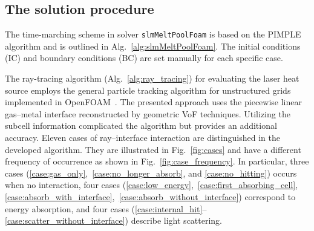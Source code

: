 \documentclass[final]{elsarticle} %
\newcommand{\OpenFOAM}{OpenFOAM\textregistered\xspace}
\begin{document}
\subsection{The solution procedure}

The time-marching scheme in solver \texttt{slmMeltPoolFoam} is based on the PIMPLE algorithm
and is outlined in Alg.~\ref{alg:slmMeltPoolFoam}.
The initial conditions (IC) and boundary conditions (BC) are set manually for each specific case.

The ray-tracing algorithm (Alg.~\ref{alg:ray_tracing}) for evaluating the laser heat source
employs the general particle tracking algorithm for unstructured grids
implemented in \OpenFOAM~\cite{macpherson2009particle}.
The presented approach uses the piecewise linear gas--metal interface reconstructed by geometric VoF techniques.
Utilizing the subcell information complicated the algorithm but provides an additional accuracy.
Eleven cases of ray--interface interaction are distinguished in the developed algorithm.
They are illustrated in Fig.~\ref{fig:cases} and have a different frequency of occurrence
as shown in Fig.~\ref{fig:case_frequency}.
In particular, three cases (\ref{case:gas_only},~\ref{case:no_longer_absorb}, and \ref{case:no_hitting})
occurs when no interaction, four cases (\ref{case:low_energy},~\ref{case:first_absorbing_cell},
\ref{case:absorb_with_interface},~\ref{case:absorb_without_interface}) correspond to energy absorption,
and four cases (\ref{case:internal_hit}--\ref{case:scatter_without_interface}) describe light scattering.
\end{document}
